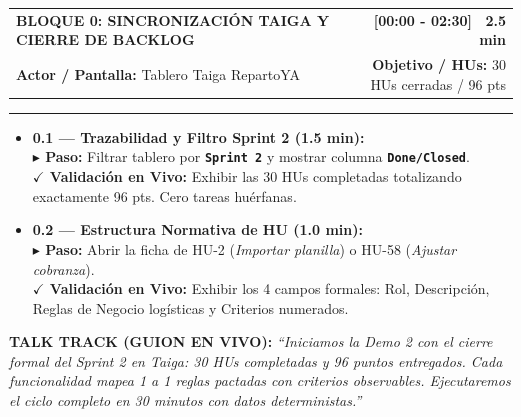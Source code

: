 \documentclass[a4paper,9pt]{article}
\makeatletter
\newcommand{\stepact}[1]{\textbf{$\blacktriangleright$ Paso:} #1}
\newcommand{\valact}[1]{\textbf{$\checkmark$ Validación en Vivo:} #1}
\newcommand{\codeb}[1]{\texttt{\bfseries #1}}
\newcommand{\blockheader}[4]{%
  \begin{tabularx}{\textwidth}{@{}X r@{}}
    {\fontsize{10.5pt}{12.5pt}\selectfont\textbf{#1}} & {\normalsize\textbf{#2}} \\
    {\footnotesize\textbf{Actor / Pantalla:} #3} & {\footnotesize\textbf{Objetivo / HUs:} #4}
  \end{tabularx}%
  \vspace{-2pt}\hrule\vspace{3.5pt}%
}
\makeatother
\begin{document}
\begin{tcolorbox}[cardframe, top=2.5pt, bottom=2.5pt]
\blockheader{BLOQUE 0: SINCRONIZACIÓN TAIGA Y CIERRE DE BACKLOG}{[00:00 - 02:30] \textbar\ 2.5 min}{Tablero Taiga RepartoYA}{30 HUs cerradas / 96 pts}
{\footnotesize
\begin{itemize}
\item \textbf{0.1 — Trazabilidad y Filtro Sprint 2 (1.5 min):} \\
\stepact{Filtrar tablero por \codeb{Sprint 2} y mostrar columna \codeb{Done/Closed}.} \\
\valact{Exhibir las 30 HUs completadas totalizando exactamente 96 pts. Cero tareas huérfanas.}
\item \textbf{0.2 — Estructura Normativa de HU (1.0 min):} \\
\stepact{Abrir la ficha de HU-2 (\textit{Importar planilla}) o HU-58 (\textit{Ajustar cobranza}).} \\
\valact{Exhibir los 4 campos formales: Rol, Descripción, Reglas de Negocio logísticas y Criterios numerados.}
\end{itemize}
}
\vspace{-2pt}
\begin{tcolorbox}[talktrackcard]
{\scriptsize\textbf{TALK TRACK (GUION EN VIVO):}} {\scriptsize\itshape ``Iniciamos la Demo 2 con el cierre formal del Sprint 2 en Taiga: 30 HUs completadas y 96 puntos entregados. Cada funcionalidad mapea 1 a 1 reglas pactadas con criterios observables. Ejecutaremos el ciclo completo en 30 minutos con datos deterministas.''}
\end{tcolorbox}
\end{tcolorbox}

\vspace{-4pt}
\end{document}
